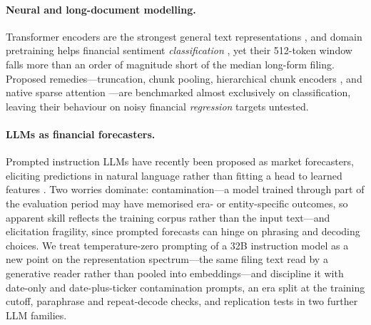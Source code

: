\paragraph{Neural and long-document modelling.}
Transformer encoders are the strongest general text representations \citep{vaswani2017attention,devlin2019bert,liu2019roberta}, and domain pretraining helps financial sentiment \emph{classification} \citep{araci2019finbert}, yet their 512-token window falls more than an order of magnitude short of the median long-form filing. Proposed remedies---truncation, chunk pooling, hierarchical chunk encoders \citep{pappagari2019hierarchical}, and native sparse attention \citep{beltagy2020longformer}---are benchmarked almost exclusively on classification, leaving their behaviour on noisy financial \emph{regression} targets untested.

\paragraph{LLMs as financial forecasters.}
Prompted instruction LLMs have recently been proposed as market forecasters, eliciting predictions in natural language rather than fitting a head to learned features \citep{lopezlira2023chatgpt}. Two worries dominate: contamination---a model trained through part of the evaluation period may have memorised era- or entity-specific outcomes, so apparent skill reflects the training corpus rather than the input text---and elicitation fragility, since prompted forecasts can hinge on phrasing and decoding choices. We treat temperature-zero prompting of a 32B instruction model \citep{qwen3_2025} as a new point on the representation spectrum---the same filing text read by a generative reader rather than pooled into embeddings---and discipline it with date-only and date-plus-ticker contamination prompts, an era split at the training cutoff, paraphrase and repeat-decode checks, and replication tests in two further LLM families.

